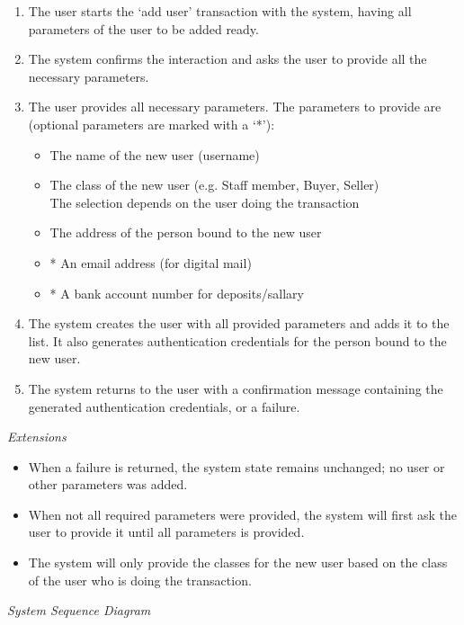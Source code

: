 \begin{enumerate}[noitemsep]
	\item The user starts the `add user' transaction with the system, having all parameters of the user to be added ready.
	\item The system confirms the interaction and asks the user to provide all the necessary parameters.
	\item The user provides all necessary parameters. The parameters to provide are (optional parameters are marked with a `*'):
	\begin{itemize}[noitemsep]
		\item The name of the new user (username)
		\item The class of the new user (e.g. Staff member, Buyer, Seller)\\
		\quad The selection depends on the user doing the transaction
		\item The address of the person bound to the new user
		\item * An email address (for digital mail)
		\item * A bank account number for deposits/sallary
	\end{itemize}
	\item The system creates the user with all provided parameters and adds it to the list. It also generates authentication credentials for the person bound to the new user.
	\item The system returns to the user with a confirmation message containing the generated authentication credentials, or a failure.
\end{enumerate}
\textsl{Extensions}
\begin{itemize}[noitemsep]
	\item When a failure is returned, the system state remains unchanged; no user or other parameters was added.
	\item When not all required parameters were provided, the system will first ask the user to provide it until all parameters is provided.
	\item The system will only provide the classes for the new user based on the class of the user who is doing the transaction.
\end{itemize}
\textsl{System Sequence Diagram}
